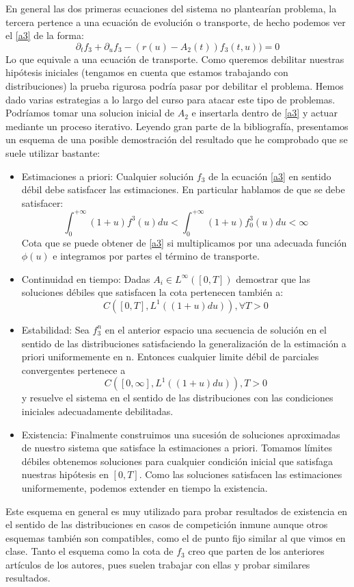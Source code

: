 \documentclass[1p]{elsarticle}
\begin{document}
En general las dos primeras ecuaciones del sistema no plantearían problema, la tercera pertence a una ecuación de evolución o transporte, de hecho podemos ver el \ref{a3} de la forma:
\begin{equation}
\partial_tf_3+\partial_uf_3-(r(u)-A_2(t))f_3(t,u))=0
\end{equation} 
Lo que equivale a una ecuación de transporte. Como queremos debilitar nuestras hipótesis iniciales (tengamos en cuenta que estamos trabajando con distribuciones) la prueba rigurosa podría pasar por debilitar el problema. Hemos dado varias estrategias a lo largo del curso para atacar este tipo de problemas. Podríamos tomar una solucion inicial de $A_2$ e insertarla dentro de \ref{a3} y actuar mediante un proceso iterativo. Leyendo gran parte de la bibliografía, presentamos un esquema de una posible demostración del resultado que he comprobado que se suele utilizar bastante:
\begin{itemize}
	\item Estimaciones a priori: Cualquier solución $f_3$ de la ecuación \ref{a3} en sentido débil debe satisfacer las estimaciones. En particular hablamos de que se debe satisfacer:
	$$ {\int_{0}^{+\infty}(1+u)f^3(u)du} <{\int_{0}^{+\infty}(1+u)f_0^3(u)du}<{\infty}$$
	Cota que se puede obtener de \ref{a3} si multiplicamos por una adecuada  función $\phi(u)$ e integramos por partes el término de transporte.
	\item Continuidad en tiempo: 
	Dadas $A_i \in L^\infty([0,T])$ demostrar que las soluciones débiles que satisfacen la cota pertenecen también a:
	$$C([0,T],L^1((1+u)du)), \forall T>0$$
	\item Estabilidad:
	Sea $f_3^n$ en el anterior espacio una secuencia de solución en el sentido de las distribuciones satisfaciendo la generalización de la estimación a priori uniformemente en n. Entonces cualquier limite débil de parciales convergentes pertenece a 
	$$C([0,\infty],L^1((1+u)du)), T>0$$
	y resuelve el sistema en el sentido de las distribuciones con las condiciones iniciales adecuadamente debilitadas.
	\item Existencia: Finalmente construimos una sucesión de soluciones aproximadas de nuestro sistema que satisface la estimaciones a priori. Tomamos límites débiles obtenemos soluciones para cualquier condición inicial que satisfaga nuestras hipótesis en $[0,T]$. Como las soluciones satisfacen las estimaciones uniformemente, podemos extender en tiempo la existencia.
\end{itemize}
 Este esquema en general es muy utilizado para probar resultados de existencia en el sentido de las distribuciones en casos de competición inmune \cite{pdf,existencia} aunque otros esquemas también son compatibles, como el de punto fijo \cite{textolargo} similar al que vimos en clase. Tanto el esquema como la cota de $f_3$ creo que parten de los anteriores artículos de los autores, pues suelen trabajar con ellas y probar similares resultados.
 
\end{document}
